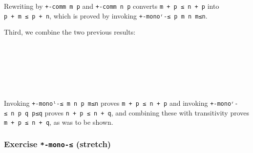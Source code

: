Rewriting by \texttt{+-comm\ m\ p} and \texttt{+-comm\ n\ p} converts
\texttt{m\ +\ p\ ≤\ n\ +\ p} into \texttt{p\ +\ m\ ≤\ p\ +\ n}, which is
proved by invoking \texttt{+-monoʳ-≤\ p\ m\ n\ m≤n}.

Third, we combine the two previous results:

\begin{fence}
\begin{code}%
\>[0]\AgdaSpace{}%
\AgdaSymbol{:}\AgdaSpace{}%
\AgdaSpace{}%
\AgdaSymbol{(}\AgdaSpace{}%
\AgdaSpace{}%
\AgdaSpace{}%
\AgdaSpace{}%
\AgdaSymbol{:}\AgdaSpace{}%
\AgdaSymbol{)}\<%
\\
\>[0][@{}l@{\AgdaIndent{0}}]%
\>[2]\AgdaSpace{}%
\AgdaSpace{}%
\AgdaSpace{}%
\<%
\\
%
\>[2]%
\>[485I]\AgdaSpace{}%
\AgdaSpace{}%
\<%
\\
\>[.][@{}l@{}]\<[485I]%
\>[4]\AgdaComment{-------------}\<%
\\
%
\>[2]\AgdaSpace{}%
\AgdaSpace{}%
\AgdaOperator{\AgdaPrimitive{+}}\AgdaSpace{}%
\AgdaSpace{}%
\AgdaSpace{}%
\AgdaSpace{}%
\AgdaOperator{\AgdaPrimitive{+}}\AgdaSpace{}%
\<%
\\
\>[0]\AgdaSpace{}%
\AgdaSpace{}%
\AgdaSpace{}%
\AgdaSpace{}%
\AgdaSpace{}%
\AgdaSpace{}%
%
\>[26]\AgdaSymbol{=}%
\>[29]\AgdaSpace{}%
\AgdaSymbol{(}\AgdaSpace{}%
\AgdaSpace{}%
\AgdaSpace{}%
\AgdaSpace{}%
\AgdaSymbol{)}\AgdaSpace{}%
\AgdaSymbol{(}\AgdaSpace{}%
\AgdaSpace{}%
\AgdaSpace{}%
\AgdaSpace{}%
\AgdaSymbol{)}\<%
\end{code}
\end{fence}

Invoking \texttt{+-monoˡ-≤\ m\ n\ p\ m≤n} proves
\texttt{m\ +\ p\ ≤\ n\ +\ p} and invoking
\texttt{+-monoʳ-≤\ n\ p\ q\ p≤q} proves \texttt{n\ +\ p\ ≤\ n\ +\ q},
and combining these with transitivity proves
\texttt{m\ +\ p\ ≤\ n\ +\ q}, as was to be shown.

\hypertarget{exercise--mono--stretch}{%
\subsubsection{\texorpdfstring{Exercise \texttt{*-mono-≤}
(stretch)}{Exercise *-mono-≤ (stretch)}}\label{exercise--mono--stretch}}

